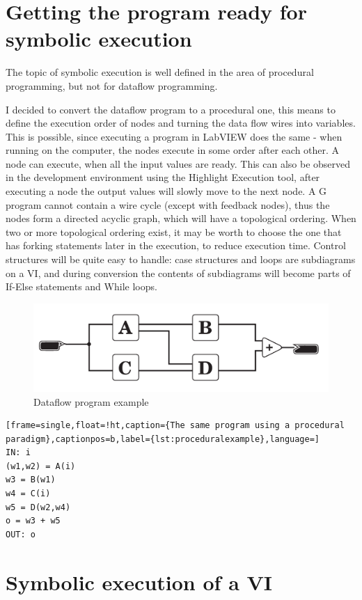 \section{Getting the program ready for symbolic execution}

The topic of symbolic execution is well defined in the area of procedural programming, but not for dataflow programming.

I decided to convert the dataflow program to a procedural one, this means to define the execution order of nodes and turning the data flow wires into variables. This is possible, since executing a program in LabVIEW does the same - when running on the computer, the nodes execute in some order after each other. A node can execute, when all the input values are ready. This can also be observed in the development environment using the Highlight Execution tool, after executing a node the output values will slowly move to the next node. A G program cannot contain a wire cycle (except with feedback nodes), thus the nodes form a directed acyclic graph, which will have a topological ordering. When two or more topological ordering exist, it may be worth to choose the one that has forking statements later in the execution, to reduce execution time. Control structures will be quite easy to handle: case structures and loops are subdiagrams on a VI, and during conversion the contents of subdiagrams will become parts of If-Else statements and While loops. 
\begin{figure}
\includegraphics[width=150mm,keepaspectratio]{figures/vi1.pdf}
\caption{Dataflow program example} 
\label{fig:dataflowexample}
\end{figure}

\begin{lstlisting}[frame=single,float=!ht,caption={The same program using a procedural paradigm},captionpos=b,label={lst:proceduralexample},language=]
IN: i
(w1,w2) = A(i)
w3 = B(w1)
w4 = C(i)
w5 = D(w2,w4)
o = w3 + w5
OUT: o
\end{lstlisting}
\section{Symbolic execution of a VI}

